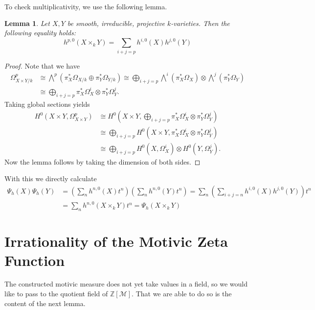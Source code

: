 \documentclass[11pt, a4paper, german, twoside]{article}
\theoremstyle{plain}
\newtheorem{lemma}[theorem]{Lemma}
\theoremstyle{definition}
\begin{document}
To check multiplicativity, we use the following lemma.

\begin{lemma}
    Let $X,Y$ be smooth, irreducible, projective $k$-varieties. Then the following equality holds:
    \[
        h^{p,0}(X \times_k Y) = \sum_{i+j=p} h^{i,0}(X)h^{j,0}(Y)
    \]
\end{lemma}
\begin{proof}
    Note that we have 
    \begin{align*}
        \Omega_{X \times Y / k}^p & \cong {\bigwedge}^p(\pi_X^*\Omega_{X/k} \oplus \pi_Y^* \Omega_{Y/k}) 
                                    \cong \bigoplus_{i+j = p} {\bigwedge}^i(\pi_X^*\Omega_X)  \otimes {\bigwedge}^j(\pi_Y^*\Omega_Y)\\
                                  & \cong \bigoplus_{i+j = p} \pi_X^*\Omega^i_X \otimes \pi_Y^*\Omega^j_Y.
    \end{align*}
    Taking global sections yields
    \begin{align*}
        H^0(X \times Y, \Omega_{X \times Y}^p) &\cong H^0(X \times Y, \bigoplus_{i+j = p} \pi_X^*\Omega^i_X \otimes \pi_Y^*\Omega^j_Y)\\
        &\cong \bigoplus_{i+j = p} H^0(X \times Y, \pi_X^*\Omega^i_X \otimes \pi_Y^*\Omega^j_Y) \\
        & \cong \bigoplus_{i+j = p} H^0(X, \Omega^i_X) \otimes H^0(Y, \Omega^j_Y).
    \end{align*}
    Now the lemma follows by taking the dimension of both sides.
\end{proof}
With this we directly calculate 
\begin{align*}
    \Psi_h(X)\Psi_h(Y) &= \left( \sum_n h^{n,0}(X)t^n \right) \left( \sum_n h^{n,0}(Y)t^n \right)  
    = \sum_n \left( \sum_{i+j=n} h^{i,0}(X) h^{j,0}(Y) \right )t^n \\ &= \sum_n h^{n,0}(X \times_k Y)t^n = \Psi_h(X \times_k Y)
\end{align*}


\section{Irrationality of the Motivic Zeta Function}
\label{final}
The constructed motivic measure does not yet take values in a field, so we would like to pass to the quotient field of $\mathbb{Z}[\mathcal{M}]$.
That we are able to do so is the content of the next lemma.
\end{document}
